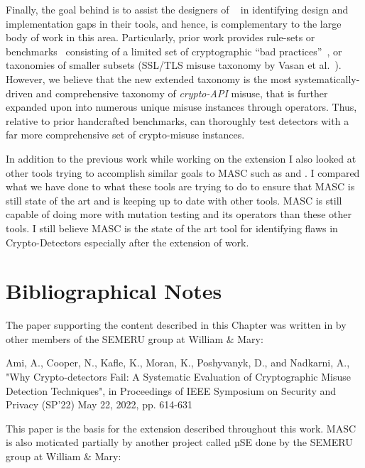 Finally, the goal behind \tool is to assist the designers of \detectors~\cite{fhm+12,ebfk13,cognicrypteclipse,knr+17,KSA+18,deepsource,snyk,sonarqube,codeguru,codiga} in identifying design and implementation gaps in their tools, and hence, \tool is complementary to the large body of work in this area.
Particularly, prior work provides rule-sets or benchmarks~\cite{BDA+17,BDA+19} consisting of a limited set of cryptographic ``bad practices''~\cite{BD16}, or taxonomies of smaller subsets (\eg SSL/TLS misuse taxonomy by Vasan et al.~\cite{NVK16}).
However, we believe that the new extended taxonomy is the most systematically-driven and comprehensive taxonomy of {\em crypto-API} misuse, that is further expanded upon into numerous unique misuse instances through \tools operators.
Thus, relative to prior handcrafted benchmarks, \tool can thoroughly test detectors with a far more comprehensive set of crypto-misuse instances.

In addition to the previous work while working on the extension I also looked at other tools trying to accomplish similar goals to MASC such as \cite{Afrose_Xiao_Rahaman_Miller_Yao_2022} and \cite{Schlichtig_Wickert_Kruger_Bodden_Mezini_2022}. I compared what we have done to what these tools are trying to do to ensure that MASC is still state of the art and is keeping up to date with other tools. MASC is still capable of doing more with mutation testing and its operators than these other tools. I still believe MASC is the state of the art tool for identifying flaws in Crypto-Detectors especially after the extension of work.






\section{Bibliographical Notes}
\label{ch1:sec:bibliographicalNotes}

The paper supporting the content described in this Chapter was written in by other members of the SEMERU group at William \& Mary:

Ami, A., Cooper, N., Kafle, K., Moran, K., Poshyvanyk, D., and Nadkarni, A., "Why Crypto-detectors Fail: A Systematic Evaluation of Cryptographic Misuse Detection Techniques", in Proceedings of IEEE Symposium on Security and Privacy (SP'22) May 22, 2022, pp. 614-631

This paper is the basis for the extension described throughout this work. MASC is also moticated partially by another project called µSE done by the SEMERU group at William \& Mary:

